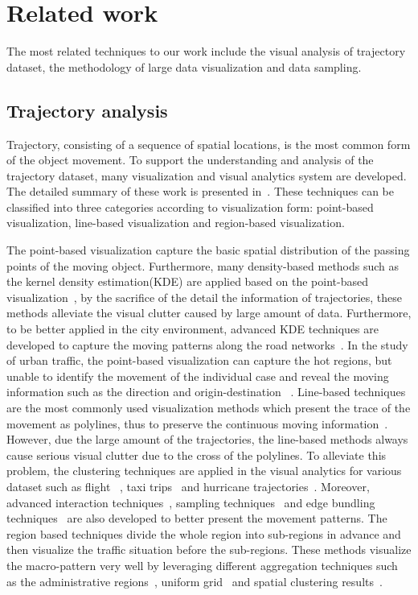 \section{Related work}
The most related techniques to our work include the visual analysis of trajectory dataset, the methodology of large data visualization and data sampling. 
\subsection{Trajectory analysis}
Trajectory, consisting of a sequence of spatial locations, is the most common form of the object movement. To support the understanding and analysis of the trajectory dataset, many visualization and visual analytics system are developed. The detailed summary of these work is presented in~\cite{chen2015survey}. These techniques can be classified into three categories according to visualization form: point-based visualization, line-based visualization and region-based visualization. 

The point-based visualization capture the basic spatial distribution of the passing points of the moving object. Furthermore, many density-based methods such as the kernel density estimation(KDE) are applied based on the point-based visualization~\cite{liu2013vait,yang2016exploring,chae2014public}, by the sacrifice of the detail the information of trajectories, these methods alleviate the visual clutter caused by large amount of data. 
Furthermore, to be better applied in the city environment, advanced KDE techniques are developed to capture the moving patterns along the road networks~\cite{xie2008kernel, borruso2008network}. In the study of urban traffic, the point-based visualization can capture the hot regions, but unable to identify the movement of the individual case and reveal the moving information such as the direction and origin-destination ~\cite{chen2015survey}. Line-based techniques are the most commonly used visualization methods which present the trace of the movement as polylines, thus to preserve the continuous moving information~\cite{guo2011tripvista,hurter2009fromdady}. 
However, due the large amount of the trajectories, the line-based methods always cause serious visual clutter due to the cross of the polylines. To alleviate this problem, the clustering techniques are applied in the visual analytics for various dataset such as flight ~\cite{ferreira2013vector}, taxi trips~\cite{rinzivillo2008visually} and hurricane trajectories~\cite{andrienko2017clustering}. 
Moreover, advanced interaction techniques~\cite{kruger2013trajectorylenses, ferreira2013visual}, sampling techniques~\cite{} and edge bundling techniques~\cite{zeng2019route} are also developed to better present the movement patterns. The region based techniques divide the whole region into sub-regions in advance and then visualize the traffic situation before the sub-regions. These methods visualize the macro-pattern very well by leveraging different aggregation techniques such as the administrative regions~\cite{guo2009flow}, uniform grid~\cite{wood2010visualisation} and spatial clustering results~\cite{von2015mobilitygraphs}.


